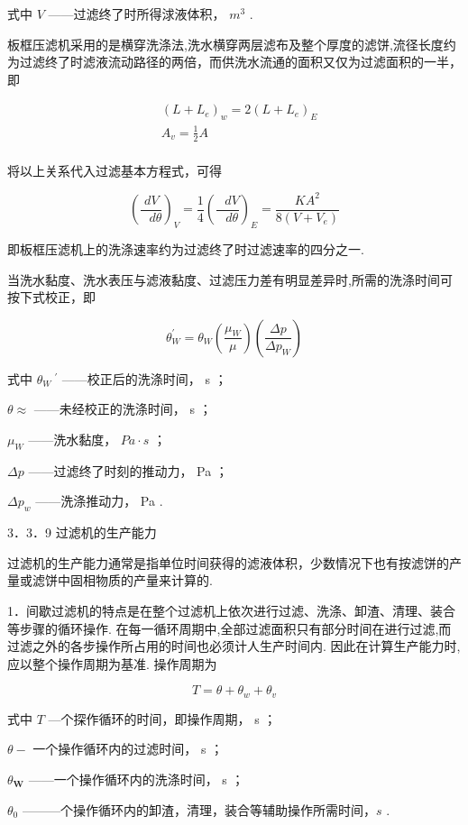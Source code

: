 \documentclass[
]{article}
\begin{document}
式中 \(V\) ------过滤终了时所得浗液体积， \(m^{3}\) . 

板框压滤机采用的是横穿洗涤法,洗水横穿两层滤布及整个厚度的滤饼,流径长度约为过滤终了时滤液流动路径的两倍，而供洗水流通的面积又仅为过滤面积的一半，即

\[\begin{matrix}
 & \left( L + L_{e} \right)_{w} = 2\left( L + L_{e} \right)_{E} \\
 & A_{v} = \frac{1}{2}A \\
\end{matrix}\]

将以上关系代入过滤基本方程式，可得

\[\left( \frac{dV}{\text{\ }d\theta} \right)_{V} = \frac{1}{4}\left( \frac{\text{\ }dV}{\text{\ }d\theta} \right)_{E} = \frac{KA^{2}}{8\left( V + V_{e} \right)}\]

即板框压滤机上的洗涤速率约为过滤终了时过滤速率的四分之一. 

当洗水黏度、洗水表压与滤液黏度、过滤压力差有明显差异时,所需的洗涤时间可按下式校正，即

\[\theta_{W}^{'} = \theta_{W}\left( \frac{\mu_{W}}{\mu} \right)\left( \frac{\Delta p}{\Delta p_{W}} \right)\]

式中 \(\theta_{W}\ ^{'}\) ------校正后的洗涤时间， s ；

\(\theta \approx\) ------未经校正的洗涤时间， s ；

\(\mu_{W}\) ------洗水黏度， \(Pa \cdot s\) ；

\(\Delta p\) ------过滤终了时刻的推动力， Pa ；

\(\Delta p_{w}\) ------洗涤推动力， Pa . 

3．3．9 过滤机的生产能力

过滤机的生产能力通常是指单位时间获得的滤液体积，少数情况下也有按滤饼的产量或滤饼中固相物质的产量来计算的. 

1．间歇过滤机的特点是在整个过滤机上依次进行过滤、洗涤、卸渣、清理、装合等步骤的循环操作. 在每一循环周期中,全部过滤面积只有部分时间在进行过滤,而过滤之外的各步操作所占用的时间也必须计人生产时间内. 因此在计算生产能力时,应以整个操作周期为基准. 操作周期为

\[T = \theta + \theta_{w} + \theta_{v}\]

式中 \(T\) ---个探作循环的时间，即操作周期， s ；

\(\theta -\) 一个操作循环内的过滤时间， s ；

\(\theta_{\mathbf{W}}\) ------一个操作循环内的洗涤时间， s ；

\(\theta_{0}\)
---------个操作循环内的卸渣，清理，装合等辅助操作所需时间，\(s\) . 
\end{document}
